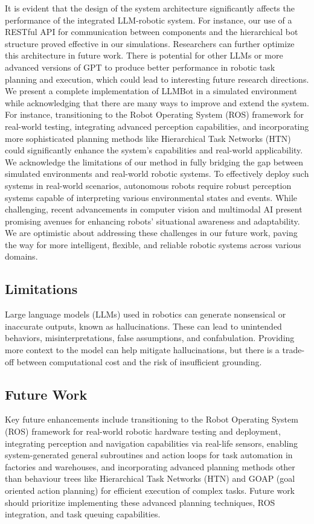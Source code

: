 \documentclass[pdflatex,sn-mathphys-num]{sn-jnl}%
\theoremstyle{thmstyleone}
\theoremstyle{thmstyletwo}%
\theoremstyle{thmstylethree}%
\begin{document}
It is evident that the design of the system architecture significantly affects the performance of the integrated LLM-robotic system. For instance, our use of a RESTful API for communication between components and the hierarchical bot structure proved effective in our simulations. Researchers can further optimize this architecture in future work. There is potential for other LLMs or more advanced versions of GPT to produce better performance in robotic task planning and execution, which could lead to interesting future research directions.
We present a complete implementation of LLMBot in a simulated environment while acknowledging that there are many ways to improve and extend the system. For instance, transitioning to the Robot Operating System (ROS) framework for real-world testing, integrating advanced perception capabilities, and incorporating more sophisticated planning methods like Hierarchical Task Networks (HTN) could significantly enhance the system's capabilities and real-world applicability.
We acknowledge the limitations of our method in fully bridging the gap between simulated environments and real-world robotic systems. To effectively deploy such systems in real-world scenarios, autonomous robots require robust perception systems capable of interpreting various environmental states and events. While challenging, recent advancements in computer vision and multimodal AI present promising avenues for enhancing robots' situational awareness and adaptability. We are optimistic about addressing these challenges in our future work, paving the way for more intelligent, flexible, and reliable robotic systems across various domains.

\subsection{Limitations}
Large language models (LLMs) used in robotics can generate nonsensical or inaccurate outputs, known as hallucinations. These can lead to unintended behaviors, misinterpretations, false assumptions, and confabulation. Providing more context to the model can help mitigate hallucinations, but there is a trade-off between computational cost and the risk of insufficient grounding.

\subsection{Future Work}
Key future enhancements include transitioning to the Robot Operating System (ROS) framework for real-world robotic hardware testing and deployment, integrating perception and navigation capabilities via real-life sensors, enabling system-generated general subroutines and action loops for task automation in factories and warehouses, and incorporating advanced planning methods other than behaviour trees like Hierarchical Task Networks (HTN) and GOAP (goal oriented action planning) for efficient execution of complex tasks. Future work should prioritize implementing these advanced planning techniques, ROS integration, and task queuing capabilities.
\end{document}
